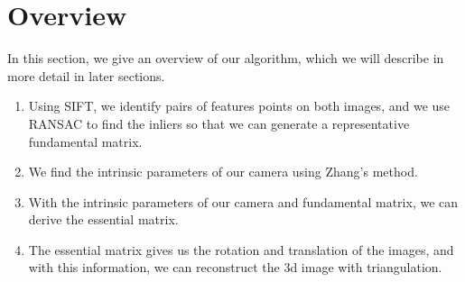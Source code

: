 \section{Overview}
\label{s:overview}

In this section, we give an overview of our algorithm, which we will describe in more detail
in later sections.

\begin{enumerate}
\item{Using SIFT, we identify pairs of features points on both images, and we use RANSAC to find the inliers so that we can generate a representative fundamental matrix.}
\item{We find the intrinsic parameters of our camera using Zhang's method.}
\item{With the intrinsic parameters of our camera and fundamental matrix, we can derive the essential matrix.}
\item{The essential matrix gives us the rotation and translation of the images, and with this information, we can reconstruct the 3d image with triangulation.}
\end{enumerate}